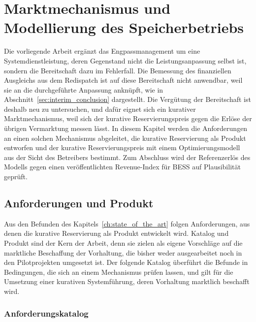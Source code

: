\chapter{Marktmechanismus und Modellierung des Speicherbetriebs}
\label{ch:design_model}
\label{ch:requirements}

Die vorliegende Arbeit ergänzt das Engpassmanagement um eine Systemdienstleistung, deren Gegenstand nicht die Leistungsanpassung selbst ist, sondern die Bereitschaft dazu im Fehlerfall.
Die Bemessung des finanziellen Ausgleichs aus dem Redispatch ist auf diese Bereitschaft nicht anwendbar, weil sie an die durchgeführte Anpassung anknüpft, wie in Abschnitt~\ref{sec:interim_conclusion} dargestellt.
Die Vergütung der Bereitschaft ist deshalb neu zu untersuchen, und dafür eignet sich ein kurativer Marktmechanismus, weil sich der kurative Reservierungspreis gegen die Erlöse der übrigen Vermarktung messen lässt.
In diesem Kapitel werden die Anforderungen an einen solchen Mechanismus abgeleitet, die kurative Reservierung als Produkt entworfen und der kurative Reservierungspreis mit einem Optimierungsmodell aus der Sicht des Betreibers bestimmt.
Zum Abschluss wird der Referenzerlös des Modells gegen einen veröffentlichten Revenue-Index für \ac{BESS} auf Plausibilität geprüft.

\section{Anforderungen und Produkt}
\label{sec:market_requirements}

Aus den Befunden des Kapitels~\ref{ch:state_of_the_art} folgen Anforderungen, aus denen die kurative Reservierung als Produkt entwickelt wird.
Katalog und Produkt sind der Kern der Arbeit, denn sie zielen als eigene Vorschläge auf die marktliche Beschaffung der Vorhaltung, die bisher weder ausgearbeitet noch in den Pilotprojekten umgesetzt ist.
Der folgende Katalog überführt die Befunde in Bedingungen, die sich an einem Mechanismus prüfen lassen, und gilt für die Umsetzung einer kurativen Systemführung, deren Vorhaltung marktlich beschafft wird.

\subsection{Anforderungskatalog}
\label{sec:requirements_catalogue}

